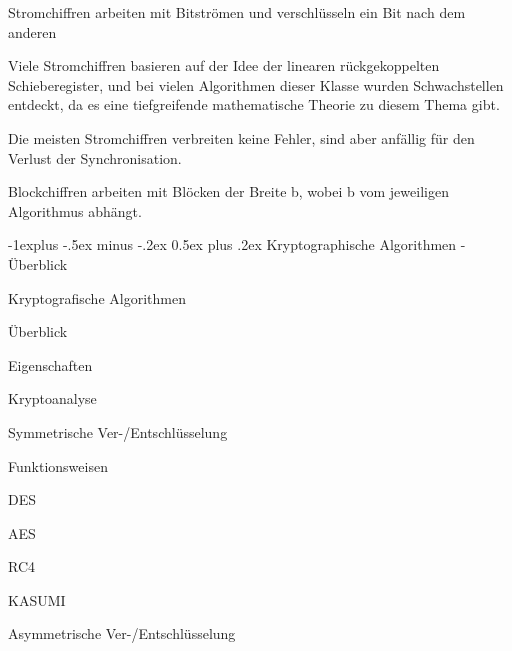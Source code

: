 \documentclass[a4paper]{article}
\makeatletter
\renewcommand{\subsection}{\@startsection{subsection}{2}{0mm}%
 {-1explus -.5ex minus -.2ex}%
 {0.5ex plus .2ex}%
 {\normalfont\normalsize\bfseries}}
\makeatother
\begin{document}
\begin{multicols}{3}
\begin{itemize*}
            \begin{itemize*}
                  \item Stromchiffren arbeiten mit Bitströmen und verschlüsseln ein Bit nach dem anderen
                  \begin{itemize*} \item Viele Stromchiffren basieren auf der Idee der linearen rückgekoppelten Schieberegister, und bei vielen Algorithmen dieser Klasse wurden Schwachstellen entdeckt, da es eine tiefgreifende mathematische Theorie zu diesem Thema gibt. \item Die meisten Stromchiffren verbreiten keine Fehler, sind aber anfällig für den Verlust der Synchronisation. \end{itemize*}
                  \item Blockchiffren arbeiten mit Blöcken der Breite b, wobei b vom jeweiligen Algorithmus abhängt.
            \end{itemize*}
      \end{itemize*}


      \subsection{Kryptographische Algorithmen -
            Überblick}

      Kryptografische Algorithmen

      \begin{itemize*}
            \item
            Überblick

            \begin{itemize*}
                  \item Eigenschaften
                  \item Kryptoanalyse
            \end{itemize*}
            \item
            Symmetrische Ver-/Entschlüsselung

            \begin{itemize*}
                  \item Funktionsweisen
                  \item DES
                  \item AES
                  \item RC4
                  \item KASUMI
            \end{itemize*}
            \item
            Asymmetrische Ver-/Entschlüsselung


\end{itemize*}
\end{multicols}
\end{document}
